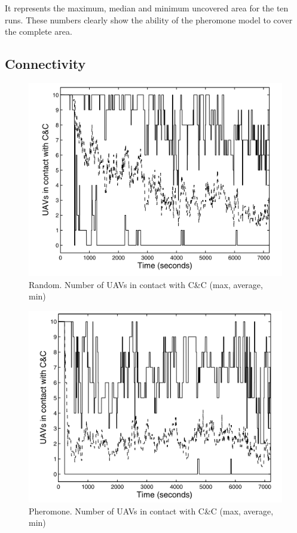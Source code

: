 It represents the maximum, median and minimum uncovered area for the ten runs. These numbers clearly show the ability of the pheromone model to cover the complete area. 

\newpage

\subsection{Connectivity}

\begin{figure}[!h]
   \includegraphics{../images/random_resultat_connectivite.png}
\caption{\label{randomconnect} Random. Number of UAVs in contact with C\&C (max, average, min)\cite{UAV}}
\end{figure}

\newpage

\begin{figure}[!h]
   \includegraphics{../images/pheromone_resultat_connectivite.png}
\caption{\label{pheromoneconnect}Pheromone. Number of UAVs in contact with C\&C (max, average, min)\cite{UAV}}
\end{figure}

